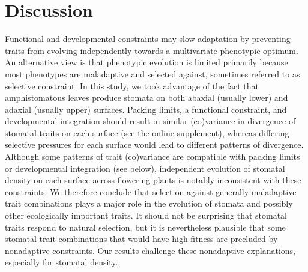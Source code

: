 \documentclass[
  12pt,
]{article}
\begin{document}
\hypertarget{discussion}{%
\section{Discussion}\label{discussion}}

Functional and developmental constraints may slow adaptation by preventing traits from evolving independently towards a multivariate phenotypic optimum. An alternative view is that phenotypic evolution is limited primarily because most phenotypes are maladaptive and selected against, sometimes referred to as selective constraint. In this study, we took advantage of the fact that amphistomatous leaves produce stomata on both abaxial (usually lower) and adaxial (usually upper) surfaces. Packing limits, a functional constraint, and developmental integration should result in similar (co)variance in divergence of stomatal traits on each surface (see the online supplement), whereas differing selective pressures for each surface would lead to different patterns of divergence. Although some patterns of trait (co)variance are compatible with packing limits or developmental integration (see below), independent evolution of stomatal density on each surface across flowering plants is notably inconsistent with these constraints. We therefore conclude that selection against generally maladaptive trait combinations plays a major role in the evolution of stomata and possibly other ecologically important traits. It should not be surprising that stomatal traits respond to natural selection, but it is nevertheless plausible that some stomatal trait combinations that would have high fitness are precluded by nonadaptive constraints. Our results challenge these nonadaptive explanations, especially for stomatal density.
\end{document}
